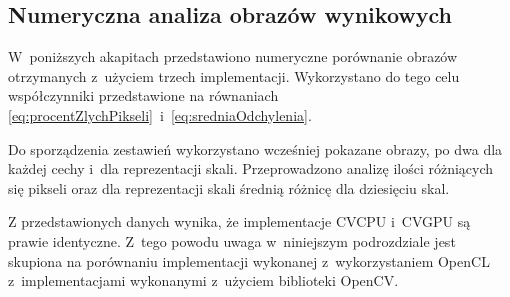 \subsection{Numeryczna analiza obrazów wynikowych}
\label{subsec:porownanieNumerycznePoprawnosc}

W~poniższych akapitach przedstawiono numeryczne porównanie obrazów otrzymanych z~użyciem trzech implementacji. Wykorzystano do tego celu współczynniki przedstawione na równaniach \eqref{eq:procentZlychPikseli}~i~\eqref{eq:sredniaOdchylenia}.

Do sporządzenia zestawień wykorzystano wcześniej pokazane obrazy, po dwa dla każdej cechy i~dla reprezentacji skali. Przeprowadzono analizę ilości różniących się pikseli oraz dla reprezentacji skali średnią różnicę dla dziesięciu skal. 

Z przedstawionych danych wynika, że implementacje CVCPU i~CVGPU są prawie identyczne. Z~tego powodu uwaga w~niniejszym podrozdziale jest skupiona na porównaniu implementacji wykonanej z~wykorzystaniem OpenCL z~implementacjami wykonanymi z~użyciem biblioteki OpenCV.

